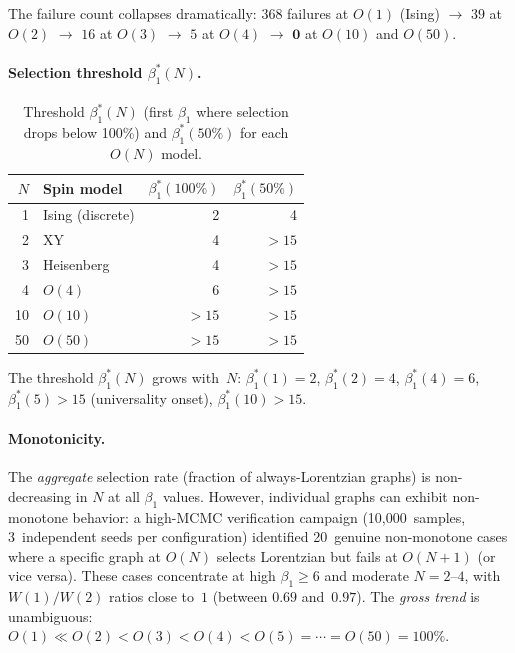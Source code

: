\documentclass[11pt]{article}
\theoremstyle{definition}
\theoremstyle{remark}
\begin{document}
The failure count collapses dramatically: $368$ failures at $O(1)$ (Ising)
$\to$ $39$ at $O(2)$ $\to$ $16$ at $O(3)$ $\to$ $5$ at $O(4)$
$\to$ $\mathbf{0}$ at $O(10)$ and $O(50)$.

\paragraph{Selection threshold $\beta_1^*(N)$.}

\begin{table}[htbp]
\centering
\caption{Threshold $\beta_1^*(N)$ (first $\beta_1$ where selection drops below 100\%)
and $\beta_1^*(50\%)$ for each $O(N)$ model.}
\label{tab:on-threshold}
\begin{tabular}{@{}rlrr@{}}
\toprule
$N$ & Spin model & $\beta_1^*(100\%)$ & $\beta_1^*(50\%)$ \\
\midrule
1  & Ising (discrete)   & 2   & 4     \\
2  & XY                 & 4   & $> 15$ \\
3  & Heisenberg         & 4   & $> 15$ \\
4  & $O(4)$             & 6   & $> 15$ \\
10 & $O(10)$            & $> 15$ & $> 15$ \\
50 & $O(50)$            & $> 15$ & $> 15$ \\
\bottomrule
\end{tabular}
\end{table}

The threshold $\beta_1^*(N)$ grows with~$N$:
$\beta_1^*(1) = 2$, $\beta_1^*(2) = 4$, $\beta_1^*(4) = 6$,
$\beta_1^*(5) > 15$ (universality onset),
$\beta_1^*(10) > 15$.

\paragraph{Monotonicity.}
The \emph{aggregate} selection rate (fraction of always-Lorentzian graphs)
is non-decreasing in $N$ at all $\beta_1$ values. However, individual graphs
can exhibit non-monotone behavior: a high-MCMC verification campaign
(10{,}000~samples, 3~independent seeds per configuration) identified
20~genuine non-monotone cases where a specific graph at $O(N)$
selects Lorentzian but fails at $O(N{+}1)$ (or vice versa). These cases
concentrate at high $\beta_1 \geq 6$ and moderate $N = 2$--$4$, with
$W(1)/W(2)$ ratios close to~$1$ (between $0.69$ and~$0.97$). The
\emph{gross trend} is unambiguous:
$O(1) \ll O(2) < O(3) < O(4) < O(5) = \cdots = O(50) = 100\%$.
\end{document}
